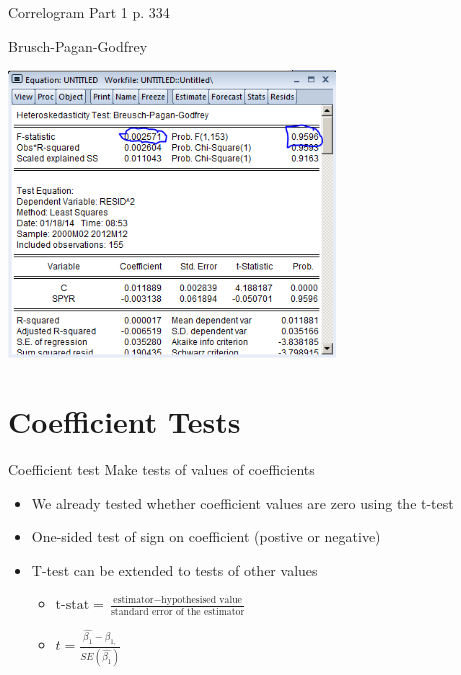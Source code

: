 \documentclass[14pt,xcolor=pdftex,dvipsnames,table]{beamer}\usepackage[]{graphicx}\usepackage[]{color}
\begin{document}
\begin{frame}{Correlogram Part 1 p. 334}
\begin{frame}{Brusch-Pagan-Godfrey}
\graphicspath{{./Figures/}}
\begin{center}
\includegraphics[height = 3.0in]{Hetf}
\end{center}
\end{frame} 


\section{Coefficient Tests}
\begin{frame}{Coefficient test}
Make tests of values of coefficients
\begin{itemize}[<+-| alert@+>]
\item We already tested whether coefficient values are zero using the t-test
\item One-sided test of sign on coefficient (postive or negative)
\item T-test can be extended to tests of other values
\begin{itemize}
\item $\text{t-stat} = \frac{\text{estimator} - \text{hypothesised value}}{\text{standard error of the estimator}}$\\ 
\item $t = \frac{\hat{\beta_1}-\beta_{1,}}{SE(\hat{\beta_1})}$\\
\end{itemize}
\end{itemize}
\end{frame}


\end{frame}
\end{document}
